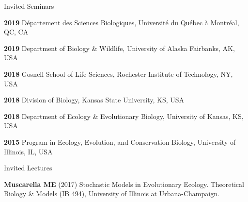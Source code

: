 \documentclass{resume} %
\begin{document}
\begin{rSection}{Invited Seminars}

  {\bf 2019}  D\'epartement des Sciences Biologiques, Universit\'e du Qu\'ebec \`a Montr\'eal, QC, CA
  
  {\bf 2019}  Department of Biology \& Wildlife, University of Alaska Fairbanks, AK, USA

  {\bf 2018}  Gosnell School of Life Sciences, Rochester Institute of Technology, NY, USA

  {\bf 2018} Division of Biology, Kansas State University, KS, USA

  {\bf 2018}  Department of Ecology \& Evolutionary Biology, University of Kansas, KS, USA

  {\bf 2015} Program in Ecology, Evolution, and Conservation Biology, University of Illinois, IL, USA

\end{rSection}


\begin{rSection}{Invited Lectures}

  {\bf Muscarella ME} (2017) Stochastic Models in Evolutionary Ecology.
	Theoretical Biology \& Models (IB 494), University of Illinois at Urbana-Champaign.

\end{rSection}
\end{document}
